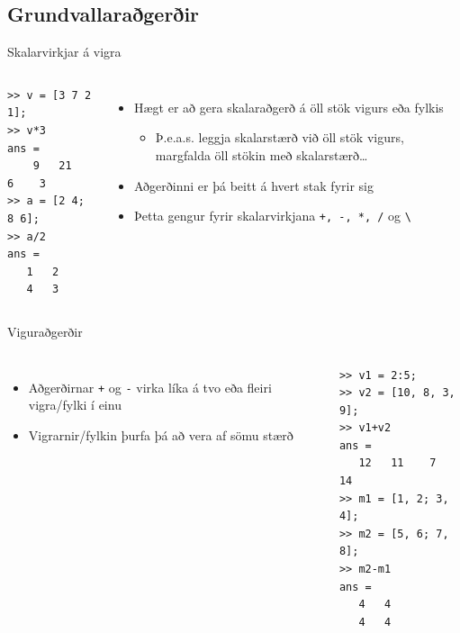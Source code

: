 \documentclass{beamer}
\begin{document}
\subsection{Grundvallaraðgerðir}

\begin{frame}[fragile]{Skalarvirkjar á vigra}
\begin{columns}
\begin{verbatim}
>> v = [3 7 2 1];
>> v*3
ans =
    9   21    6    3
>> a = [2 4; 8 6];
>> a/2
ans =
   1   2
   4   3
\end{verbatim}

\begin{itemize}
 \item Hægt er að gera skalaraðgerð á öll stök vigurs eða fylkis
 \begin{itemize}
  \item Þ.e.a.s. leggja skalarstærð við öll stök vigurs, margfalda öll stökin með skalarstærð\ldots
 \end{itemize}
 \item Aðgerðinni er þá beitt á hvert stak fyrir sig
 \item Þetta gengur fyrir skalarvirkjana \texttt{+, -, *, /} og \texttt{\textbackslash}
\end{itemize}
\end{columns}
\end{frame}

\begin{frame}[fragile]{Viguraðgerðir}
\begin{columns}
\begin{itemize}
 \item Aðgerðirnar \texttt{+} og \texttt{-} virka líka á tvo eða fleiri vigra/fylki í einu
 \item Vigrarnir/fylkin þurfa þá að vera af sömu stærð
\end{itemize}

\begin{verbatim}
>> v1 = 2:5;
>> v2 = [10, 8, 3, 9];
>> v1+v2
ans =
   12   11    7   14
>> m1 = [1, 2; 3, 4];
>> m2 = [5, 6; 7, 8];
>> m2-m1
ans =
   4   4
   4   4
\end{verbatim}
\end{columns}
\end{frame}
\end{document}
